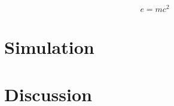 \documentclass[twoside,twocolumn]{article}
\begin{document}
\begin{equation}
\label{eq:emc}
e = mc^2
\end{equation}

\blindtext %


\section{Simulation}

\blindtext %


\section{Discussion}

\blindtext %
\end{document}

